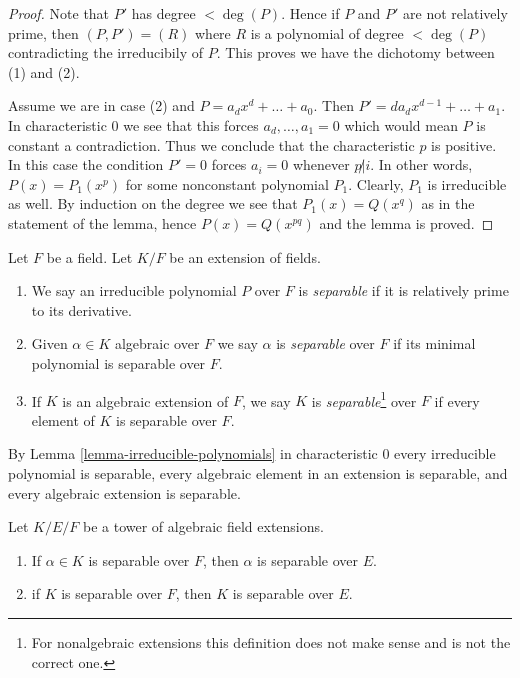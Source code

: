 \begin{proof}
Note that $P'$ has degree $< \deg(P)$. Hence if $P$ and $P'$ are not relatively
prime, then $(P, P') = (R)$ where $R$ is a polynomial of degree $< \deg(P)$
contradicting the irreducibily of $P$. This proves we have the dichotomy
between (1) and (2).

\medskip\noindent
Assume we are in case (2) and $P = a_d x^d + \ldots + a_0$. Then
$P' = da_d x^{d - 1} + \ldots + a_1$. In characteristic $0$ we see
that this forces $a_d, \ldots, a_1 = 0$ which would mean $P$ is constant
a contradiction. Thus we conclude that the characteristic $p$ is positive.
In this case the condition $P' = 0$ forces $a_i = 0$ whenever $p \not | i$.
In other words, $P(x) = P_1(x^p)$ for some nonconstant polynomial $P_1$.
Clearly, $P_1$ is irreducible as well. By induction on the degree we
see that $P_1(x) = Q(x^q)$ as in the statement of the lemma, hence
$P(x) = Q(x^{pq})$ and the lemma is proved.
\end{proof}

\begin{definition}
\label{definition-separable}
Let $F$ be a field. Let $K/F$ be an extension of fields.
\begin{enumerate}
\item We say an irreducible polynomial $P$ over $F$ is {\it separable}
if it is relatively prime to its derivative.
\item Given $\alpha \in K$ algebraic over $F$ we say $\alpha$ is
{\it separable} over $F$ if its minimal polynomial is separable over $F$.
\item If $K$ is an algebraic extension of $F$, we say $K$ is
{\it separable}\footnote{For nonalgebraic extensions
this definition does not make sense and is not the correct one.}
over $F$ if every element of $K$ is separable over $F$.
\end{enumerate}
\end{definition}

\noindent
By Lemma \ref{lemma-irreducible-polynomials} in characteristic $0$ every
irreducible polynomial is separable, every algebraic element in an extension
is separable, and every algebraic extension is separable.

\begin{lemma}
\label{lemma-separable-goes-up}
Let $K/E/F$ be a tower of algebraic field extensions.
\begin{enumerate}
\item If $\alpha \in K$ is separable over $F$, then $\alpha$ is separable
over $E$.
\item if $K$ is separable over $F$, then $K$ is separable over $E$.
\end{enumerate}
\end{lemma}

